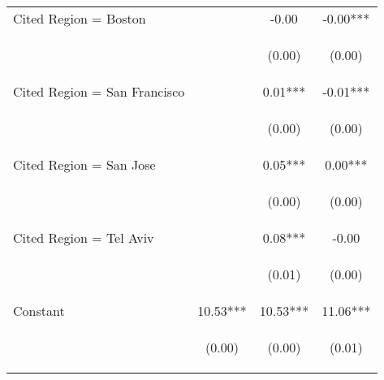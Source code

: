 \begin{center}
\begin{tabular}{lccc}
Cited Region = Boston &  & -0.00 & -0.00*** \\
\vspace{4pt} & \begin{footnotesize}\end{footnotesize} & \begin{footnotesize}(0.00)\end{footnotesize} & \begin{footnotesize}(0.00)\end{footnotesize} \\
Cited Region = San Francisco &  & 0.01*** & -0.01*** \\
\vspace{4pt} & \begin{footnotesize}\end{footnotesize} & \begin{footnotesize}(0.00)\end{footnotesize} & \begin{footnotesize}(0.00)\end{footnotesize} \\
Cited Region = San Jose &  & 0.05*** & 0.00*** \\
\vspace{4pt} & \begin{footnotesize}\end{footnotesize} & \begin{footnotesize}(0.00)\end{footnotesize} & \begin{footnotesize}(0.00)\end{footnotesize} \\
Cited Region = Tel Aviv &  & 0.08*** & -0.00 \\
\vspace{4pt} & \begin{footnotesize}\end{footnotesize} & \begin{footnotesize}(0.01)\end{footnotesize} & \begin{footnotesize}(0.00)\end{footnotesize} \\
Constant & 10.53*** & 10.53*** & 11.06*** \\
 & \begin{footnotesize}(0.00)\end{footnotesize} & \begin{footnotesize}(0.00)\end{footnotesize} & \begin{footnotesize}(0.01)\end{footnotesize} \\

\end{tabular}
\end{center}
